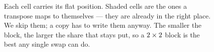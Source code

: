 \begin{figure}[!t]
\centering
%
\caption{
Each cell carries its flat position. Shaded cells are the ones a transpose maps
to themselves --- they are already in the right place. We skip them; a copy has
to write them anyway. The smaller the block, the larger the share that stays
put, so a $2 \times 2$ block is the best any
single swap can do.}
\label{fig:weight}
\end{figure}
